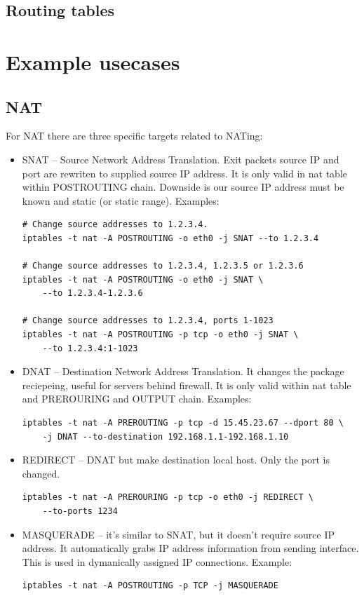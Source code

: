 \documentclass[times, utf8, seminar, english]{fer}
\begin{document}
\section{Routing tables}

\chapter{Example usecases}

\section{NAT}
\label{sec:NAT}

For NAT there are three specific targets related to NATing:
\begin{itemize}
    \item SNAT -- Source Network Address Translation. Exit packets source IP and port are rewriten to supplied source IP address. It is only valid in nat table within POSTROUTING chain. Downside is our source IP address must be known and static (or static range). Examples:
    \begin{verbatim}
# Change source addresses to 1.2.3.4.
iptables -t nat -A POSTROUTING -o eth0 -j SNAT --to 1.2.3.4

# Change source addresses to 1.2.3.4, 1.2.3.5 or 1.2.3.6
iptables -t nat -A POSTROUTING -o eth0 -j SNAT \
    --to 1.2.3.4-1.2.3.6

# Change source addresses to 1.2.3.4, ports 1-1023
iptables -t nat -A POSTROUTING -p tcp -o eth0 -j SNAT \
    --to 1.2.3.4:1-1023
    \end{verbatim}
    \item DNAT -- Destination Network Address Translation. It changes the package reciepeing, useful for servers behind firewall. It is only valid within nat table and PREROURING and OUTPUT chain. Examples:
    \begin{verbatim}
iptables -t nat -A PREROUTING -p tcp -d 15.45.23.67 --dport 80 \
    -j DNAT --to-destination 192.168.1.1-192.168.1.10
    \end{verbatim}
    \item REDIRECT -- DNAT but make destination local host. Only the port is changed.
    \begin{verbatim}
iptables -t nat -A PREROURING -p tcp -o eth0 -j REDIRECT \
    --to-ports 1234
    \end{verbatim}
    \item MASQUERADE -- it's similar to SNAT, but it doesn't require source IP address. It automatically grabs IP address information from sending interface. This is used in dymanically assigned IP connections. Example:
    \begin{verbatim}
iptables -t nat -A POSTROUTING -p TCP -j MASQUERADE
    \end{verbatim}
\end{itemize}
\end{document}
